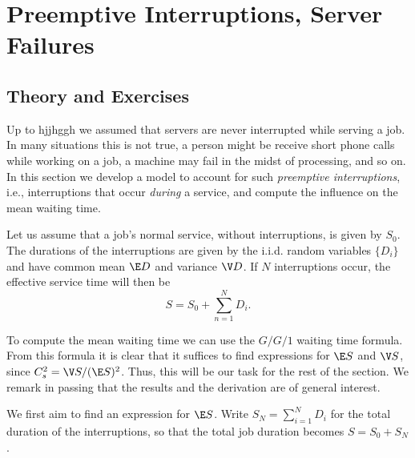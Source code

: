 \section{Preemptive Interruptions, Server Failures}
\label{sec:preempt-interr-serv}

\subsection*{Theory and Exercises}



Up to hjjhggh we assumed that servers are never interrupted while serving a job. In many situations this is not true, a person  might be receive short phone calls while working on a job, a machine may fail in the midst of processing, and so on. In this section we develop a model to account for such \emph{preemptive interruptions}, i.e., interruptions that occur \emph{during} a service, and compute the influence on the mean waiting time. 

Let us assume that a job's normal service, without interruptions, is given by $S_0$. The durations of the interruptions are given by the i.i.d. random variables $\{D_i\}$ and have common mean $\E D$ and variance $\V D$. If $N$ interruptions occur, the effective service time will then be
\begin{equation*}
S= S_0 + \sum_{n=1}^N D_i.
\end{equation*}

To compute the mean waiting time we can use the $G/G/1$ waiting time formula. From this formula it is clear that it suffices to find expressions for $\E S$ and $\V S$, since $C_s^2 = \V S /(\E S)^2$.  Thus, this will be our task for the rest of the section. We remark in passing that the results and the derivation are of general interest.

We first aim to find an expression for $\E S$.  Write  $S_N = \sum_{i=1}^N D_i$ for the total duration of the interruptions, so that the total job duration becomes $S = S_0 + S_N$.

